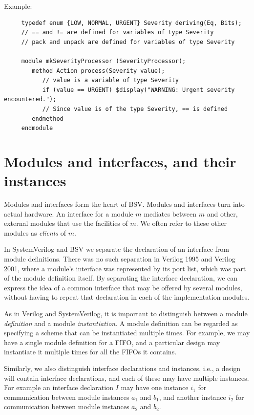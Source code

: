 \documentclass[twoside,letterpaper]{article}
\newcommand{\BSV}{BSV}
\newcommand{\SV}{SystemVerilog}
\newcommand{\V}{Verilog}
\newcommand{\VOrig}{Verilog 1995}
\newcommand{\VTwoK}{Verilog 2001}
\begin{document}
Example:
\begin{verbatim}
     typedef enum {LOW, NORMAL, URGENT} Severity deriving(Eq, Bits);
     // == and != are defined for variables of type Severity
     // pack and unpack are defined for variables of type Severity 

     module mkSeverityProcessor (SeverityProcessor);
        method Action process(Severity value);
           // value is a variable of type Severity
           if (value == URGENT) $display("WARNING: Urgent severity encountered.");
           // Since value is of the type Severity, == is defined
        endmethod
     endmodule
\end{verbatim}

\section{Modules and interfaces, and their instances}

\label{sec-modules-interfaces}

Modules and interfaces form the heart of {\BSV}.  Modules and
interfaces turn into actual hardware.  An interface for a module $m$
mediates between $m$ and other, external modules that use the
facilities of $m$.  We often refer to these other modules as
\emph{clients} of $m$.

In {\SV} and {\BSV} we separate the declaration of an interface from
module definitions.  There was no such separation in {\VOrig} and
{\VTwoK}, where a module's interface was represented by its port list,
which was part of the module definition itself.  By separating the
interface declaration, we can express the idea of a common interface
that may be offered by several modules, without having to repeat that
declaration in each of the implementation modules.

As in {\V} and {\SV}, it is important to distinguish between a module
\emph{definition} and a module \emph{instantiation}.  A module
definition can be regarded as specifying a scheme that can be
instantiated multiple times.  For example, we may have a single module
definition for a FIFO, and a particular design may instantiate it
multiple times for all the FIFOs it contains.

Similarly, we also distinguish interface declarations and instances,
i.e., a design will contain interface declarations, and each of these
may have multiple instances.  For example an interface declaration $I$
may have one instance $i_1$ for communication between module instances
$a_1$ and $b_1$, and another instance $i_2$ for communication between
module instances $a_2$ and $b_2$.
\end{document}

